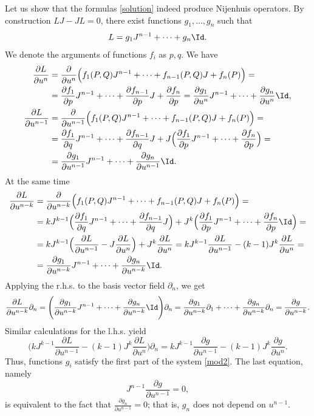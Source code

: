\documentclass[12pt]{article}
\theoremstyle{remark}
\newcommand{\pd}[2]{\frac{\partial#1}{\partial#2}}
\begin{document}
Let us show that the formulas \eqref{solution} indeed produce Nijenhuis operators. By construction $LJ - JL = 0$, there exist functions $g_1, \dots, g_n$ such that
$$
L = g_1 J^{n - 1} + \dots + g_n \Id.
$$
We denote the arguments of functions $f_i$ as $p, q$. We have
$$
\begin{aligned}
\pd{L}{u^n} & = \pd{}{u^n} \Big( f_1(P, Q) J^{n - 1} + \dots + f_{n - 1}(P, Q) J + f_n(P) \Big) = \\
& = \pd{f_1}{p} J^{n - 1} + \dots + \pd{f_{n - 1}}{p} J + \pd{f_n}{p} = \pd{g_1}{u^n} J^{n - 1} + \dots + \pd{g_n}{u^n} \Id, \\
\pd{L}{u^{n - 1}} & = \pd{}{u^{n - 1}} \Big( f_1(P, Q) J^{n - 1} + \dots + f_{n - 1}(P, Q) J + f_n(P) \Big) = \\
& = \pd{f_1}{q} J^{n - 1} + \dots + \pd{f_{n - 1}}{q} J + J \Big(\pd{f_1}{p} J^{n - 1} + \dots + \pd{f_n}{p}\Big) = \\
& = \pd{g_1}{u^{n - 1}} J^{n - 1} + \dots + \pd{g_n}{u^{n-1}} \Id.
\end{aligned}
$$
At the same time
$$
\begin{aligned}
\pd{L}{u^{n - k}} & = \pd{}{u^{n - k}} \Big( f_1(P, Q) J^{n - 1} + \dots + f_{n - 1}(P, Q) J + f_n(P) \Big) = \\
& = k J^{k - 1} \Big(\pd{f_1}{q} J^{n - 1} + \dots + \pd{f_{n - 1}}{q} J\Big) + J^k \Big(\pd{f_1}{p} J^{n - 1} + \dots + \pd{f_n}{p} \Id \Big) = \\
&  = k J^{k - 1} \Big( \pd{L}{u^{n - 1}} - J \pd{L}{u^n}\Big) + J^k \pd{L}{u^n} = k J^{k - 1} \pd{L}{u^{n - 1}} - (k - 1) J^k \pd{L}{u^n} =   \\
& = \pd{g_1}{u^{n - k}} J^{n - 1} + \dots + \pd{g_n}{u^{n-k}} \Id.
\end{aligned}
$$
Applying the r.h.s. to the basis vector field $\partial_n$, we get
$$
\begin{aligned}
\pd{L}{u^{n - k}} \partial_n = \Bigg( \pd{g_1}{u^{n - k}} J^{n - 1} + \dots + \pd{g_n}{u^{n - k}} \Id\Bigg) \partial_n = \pd{g_1}{u^{n - k}}\partial_1 + \dots + \pd{g_n}{u^{n - k}} \partial_n = \pd{g}{u^{n - k}}.
\end{aligned}
$$
Similar calculations for the l.h.s. yield
$$
\Big(k J^{k - 1} \pd{L}{u^{n - 1}} - (k - 1) J^k \pd{L}{u^n}\Big) \partial_n = k J^{k - 1} \pd{g}{u^{n - 1}} - (k - 1) J^k \pd{g}{u^n}.
$$
Thus, functions $g_i$ satisfy the first part of the system \eqref{mod2}. The last equation, namely $$ 
J^{n - 1} \pd{g}{u^{n - 1}} = 0,
$$
is equivalent to the fact that $\pd{g_n}{u^{n - 1}} = 0$; that is, $g_n$ does not depend on $u^{n - 1}$. 
\end{document}

